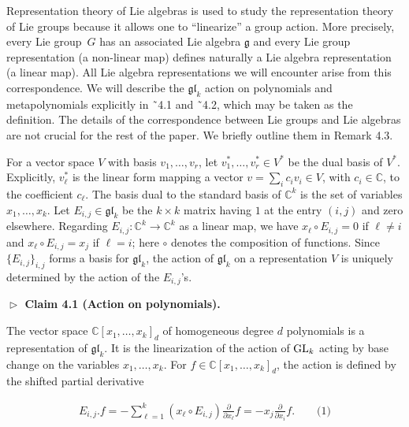 Representation theory of Lie algebras is used to study the representation theory of Lie groups because it allows one to “linearize” a group action.
More precisely, every Lie group $G$ has an associated Lie algebra $\mathfrak{g}$ and every Lie group representation (a non-linear map) defines naturally a Lie algebra representation (a linear map).
All Lie algebra representations we will encounter arise from this correspondence. We will describe the $\mathfrak{gl}_{k}$ action on polynomials and metapolynomials explicitly in ˜4.1 and ˜4.2, which may be taken as the definition. The details of the correspondence between Lie groups and Lie algebras are not crucial for the rest of the paper. We briefly outline them in Remark 4.3.





For a vector space $V$ with basis $v_{1},\ldots,v_{r}$, let $v_{1}^{*},\ldots,v_{r}^{*}\in V^{*}$ be the dual basis of $V^{*}$.
Explicitly, $v_{\ell}^{*}$ is the linear form mapping a vector $v=\sum_{i}c_{i}v_{i}\in V$, with $c_{i}\in\mathbb{C}$, to the coefficient $c_{\ell}$.
The basis dual to the standard basis of $\mathbb{C}^{k}$ is the set of variables $x_{1},\ldots,x_{k}$.
Let $E_{i,j}\in\mathfrak{gl}_{k}$ be the $k\times k$ matrix having $1$ at the entry $(i,j)$ and zero elsewhere. Regarding $E_{i,j}:\mathbb{C}^{k}\to\mathbb{C}^{k}$ as a linear map, we have $x_{\ell}\circ E_{i,j}=0$ if $\ell\neq i$ and $x_{\ell}\circ E_{i,j}=x_{j}$ if $\ell=i$; here $\circ$ denotes the composition of functions. Since $\{E_{i,j}\}_{i,j}$ forms a basis for $\mathfrak{gl}_{k}$, the action of $\mathfrak{gl}_{k}$ on a representation $V$ is uniquely determined by the action of the $E_{i,j}$’s.





\par\medskip\noindent\textbf{$\vartriangleright$ Claim 4.1 (Action on polynomials).}\par



The vector space $\mathbb{C}[x_{1},\ldots,x_{k}]_{d}$ of homogeneous degree $d$ polynomials is a representation of $\mathfrak{gl}_{k}$. It is the linearization of the action of $\textnormal{GL}_{k}$ acting by base change on the variables $x_{1},\ldots,x_{k}$.
For $f\in\mathbb{C}[x_{1},\ldots,x_{k}]_{d}$, the action is defined by the shifted partial derivative



\[\begin{aligned}
\displaystyle E_{i,j}.f=-\sum_{\ell=1}^{k}(x_{\ell}\circ E_{i,j})\frac{\partial}{\partial x_{\ell}}f=-x_{j}\frac{\partial}{\partial x_{i}}f.\qquad\text{(1)}
\end{aligned}\]


